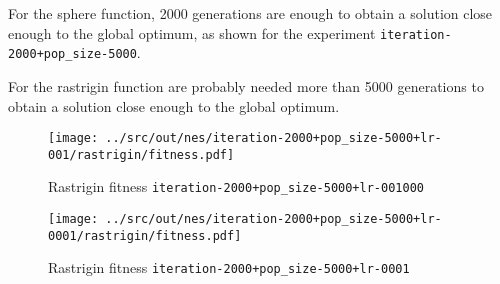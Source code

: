 For the sphere function, 2000 generations are enough to obtain a solution close enough to the global optimum, as shown for the experiment \texttt{iteration-2000+pop\_size-5000}.

For the rastrigin function are probably needed more than 5000 generations to obtain a solution close enough to the global optimum.

\begin{figure}[H]
	\centering
	\begin{minipage}[b]{.6\textwidth}
		\texttt{[image: ../src/out/nes/iteration-2000+pop\_size-5000+lr-001/rastrigin/fitness.pdf]}	
	\end{minipage}
	\caption{Rastrigin fitness \texttt{iteration-2000+pop\_size-5000+lr-001000}}
	\label{fig:nes-r-fitness/001}
\end{figure}
\begin{figure}[H]
	\centering
	\begin{minipage}[b]{.6\textwidth}
		\texttt{[image: ../src/out/nes/iteration-2000+pop\_size-5000+lr-0001/rastrigin/fitness.pdf]}	
	\end{minipage}
	\caption{Rastrigin fitness \texttt{iteration-2000+pop\_size-5000+lr-0001}}
	\label{fig:nes-r-fitness/0001}
\end{figure}
